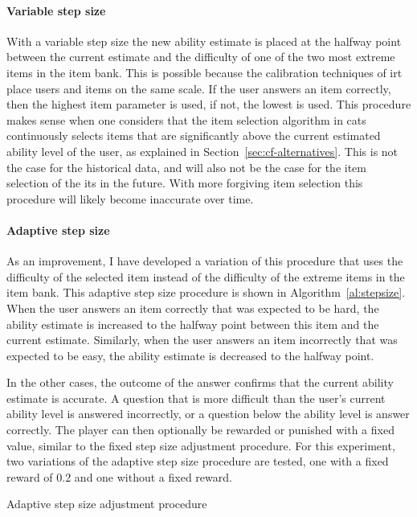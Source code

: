 \paragraph{Variable step size} With a variable step size the new ability estimate is placed at the halfway point between the current estimate and the difficulty of one of the two most extreme items in the item bank.
This is possible because the calibration techniques of \gls{irt} place users and items on the same scale.
If the user answers an item correctly, then the highest item parameter is used, if not, the lowest is used.
This procedure makes sense when one considers that the item selection algorithm in \glspl{cat} continuously selects items that are significantly above the current estimated ability level of the user, as explained in Section~\ref{sec:cf-alternatives}.
This is not the case for the historical data, and will also not be the case for the item selection of the \gls{its} in the future.
With more forgiving item selection this procedure will likely become inaccurate over time.

\paragraph{Adaptive step size} As an improvement, I have developed a variation of this procedure that uses the difficulty of the selected item instead of the difficulty of the extreme items in the item bank.
This adaptive step size procedure is shown in Algorithm~\ref{al:stepsize}.
When the user answers an item correctly that was expected to be hard, the ability estimate is increased to the halfway point between this item and the current estimate.
Similarly, when the user answers an item incorrectly that was expected to be easy, the ability estimate is decreased to the halfway point.

In the other cases, the outcome of the answer confirms that the current ability estimate is accurate.
A question that is more difficult than the user's current ability level is answered incorrectly, or a question below the ability level is answer correctly.
The player can then optionally be rewarded or punished with a fixed value, similar to the fixed step size adjustment procedure.
For this experiment, two variations of the adaptive step size procedure are tested, one with a fixed reward of 0.2 and one without a fixed reward.

\begin{algorithm}
\SetAlgoLined
{}
\caption{\label{al:stepsize}Adaptive step size adjustment procedure}
\end{algorithm}

